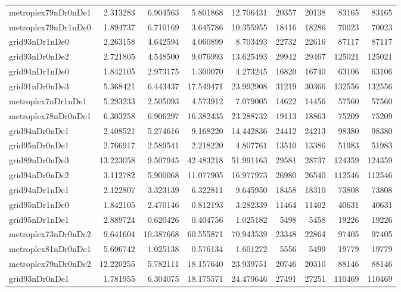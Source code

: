 \begin{longtable}{|l|r|r|r|r|r|r|r|r|}
metroplex79nDr0nDe1 & 2.313283 & 6.904563 & 5.801868 & 12.706431 & 20357 & 20138 & 83165 & 83165 \\
metroplex79nDr1nDe0 & 1.894737 & 6.710169 & 3.645786 & 10.355955 & 18416 & 18286 & 70023 & 70023 \\
grid93nDr1nDe0 & 2.263158 & 4.642594 & 4.060899 & 8.703493 & 22732 & 22616 & 87117 & 87117 \\
grid93nDr0nDe2 & 2.721805 & 4.548500 & 9.076993 & 13.625493 & 29942 & 29467 & 125021 & 125021 \\
grid94nDr1nDe0 & 1.842105 & 2.973175 & 1.300070 & 4.273245 & 16820 & 16740 & 63106 & 63106 \\
grid91nDr0nDe3 & 5.368421 & 6.443437 & 17.549471 & 23.992908 & 31219 & 30366 & 132556 & 132556 \\
metroplex7nDr1nDe1 & 5.293233 & 2.505093 & 4.573912 & 7.079005 & 14622 & 14456 & 57560 & 57560 \\
metroplex78nDr0nDe1 & 6.303258 & 6.906297 & 16.382435 & 23.288732 & 19113 & 18863 & 75209 & 75209 \\
grid94nDr0nDe1 & 2.408521 & 5.274616 & 9.168220 & 14.442836 & 24412 & 24213 & 98380 & 98380 \\
grid95nDr0nDe1 & 2.766917 & 2.589541 & 2.218220 & 4.807761 & 13510 & 13386 & 51983 & 51983 \\
grid89nDr0nDe3 & 13.223058 & 9.507945 & 42.483218 & 51.991163 & 29581 & 28737 & 124359 & 124359 \\
grid94nDr0nDe2 & 3.112782 & 5.900068 & 11.077905 & 16.977973 & 26980 & 26540 & 112546 & 112546 \\
grid94nDr1nDe1 & 2.122807 & 3.323139 & 6.322811 & 9.645950 & 18458 & 18310 & 73808 & 73808 \\
grid95nDr1nDe0 & 1.842105 & 2.470146 & 0.812193 & 3.282339 & 11464 & 11402 & 40631 & 40631 \\
grid95nDr1nDe1 & 2.889724 & 0.620426 & 0.404756 & 1.025182 & 5498 & 5458 & 19226 & 19226 \\
metroplex73nDr0nDe2 & 9.641604 & 10.387668 & 60.555871 & 70.943539 & 23348 & 22864 & 97405 & 97405 \\
metroplex81nDr0nDe1 & 5.696742 & 1.025138 & 0.576134 & 1.601272 & 5556 & 5499 & 19779 & 19779 \\
metroplex79nDr0nDe2 & 12.220255 & 5.782111 & 18.157640 & 23.939751 & 20746 & 20310 & 88146 & 88146 \\
grid93nDr0nDe1 & 1.781955 & 6.304075 & 18.175571 & 24.479646 & 27491 & 27251 & 110469 & 110469 \\

\end{longtable}
